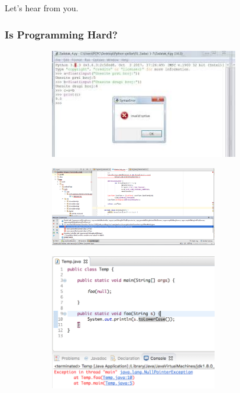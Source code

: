 \documentclass{beamer}
\begin{document}
\begin{frame}
  \begin{center}
    \huge Let's hear from you.
  \end{center}
\end{frame}

\begin{frame}
  \frametitle{Is Programming Hard?}
  \begin{figure}[t]
    \begin{subfigure}[b]{0.3\textwidth}
      \includegraphics[width=0.9\textwidth]{images/syntax-error.jpeg}
    \end{subfigure}
    \pause
    \begin{subfigure}[b]{0.3\textwidth}
      \includegraphics[width=0.8\textwidth]{images/type-error.png}
    \end{subfigure}
    \pause
    \begin{subfigure}[b]{0.3\textwidth}
      \includegraphics[width=0.8\textwidth]{images/nullpointerexception.png}

\end{subfigure}
\end{figure}
\end{frame}
\end{document}
